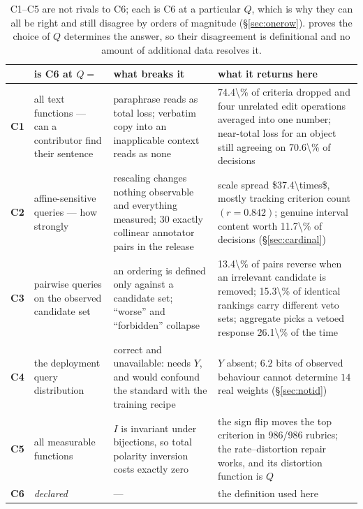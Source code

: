\begin{table}[H]\centering\footnotesize
\begin{tabularx}{\textwidth}{P{0.8cm}P{3.5cm}P{4.4cm}Y}
\toprule
& \textbf{is C6 at $Q =$} & \textbf{what breaks it} & \textbf{what it returns here}\\
\midrule
\textbf{C1} & all text functions --- can a contributor find their sentence
& paraphrase reads as total loss; verbatim copy into an inapplicable context
reads as none & \num{74.4\%} of criteria dropped and four unrelated edit
operations averaged into one number; near-total loss for an object still agreeing
on \num{70.6\%} of decisions\\
\textbf{C2} & affine-sensitive queries --- how strongly
& rescaling changes nothing observable and everything measured; $30$ exactly
collinear annotator pairs in the release & scale spread \num{$37.4\times$}, mostly
tracking criterion count $(r = 0.842)$; genuine interval content worth
\num{11.7\%} of decisions (§\ref{sec:cardinal})\\
\textbf{C3} & pairwise queries on the observed candidate set
& an ordering is defined only against a candidate set; ``worse'' and
``forbidden'' collapse & \num{13.4\%} of pairs reverse when an irrelevant
candidate is removed; \num{15.3\%} of identical rankings carry different veto
sets; aggregate picks a vetoed response \num{26.1\%} of the time\\
\textbf{C4} & the deployment query distribution
& correct and unavailable: needs $Y$, and would confound the standard with the
training recipe & $Y$ absent; $6.2$ bits of observed behaviour cannot determine
$14$ real weights (§\ref{sec:notid})\\
\textbf{C5} & all measurable functions
& $I$ is invariant under bijections, so total polarity inversion costs exactly
zero & the sign flip moves the top criterion in \num{986/986} rubrics; the
rate--distortion repair works, and its distortion function is $Q$\\
\midrule
\textbf{C6} & \emph{declared} & --- & the definition used here\\
\bottomrule
\end{tabularx}
\caption{C1--C5 are not rivals to C6; each is C6 at a particular $Q$, which is
why they can all be right and still disagree by orders of magnitude
(§\ref{sec:onerow}).  proves the choice of $Q$ determines the answer,
so their disagreement is definitional and no amount of additional data resolves
it.}
\label{tab:candidates}
\end{table}


